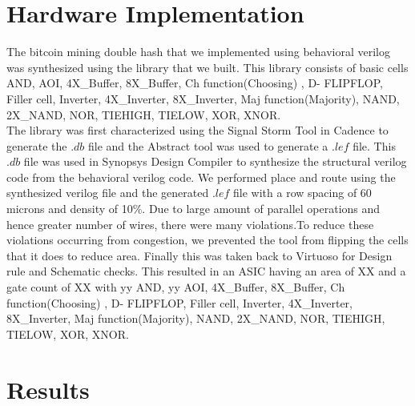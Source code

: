 \section{Hardware Implementation} 
The bitcoin mining double hash that we implemented using behavioral verilog was synthesized using the library that we built. This library consists of basic cells AND, AOI, 4X\_Buffer, 8X\_Buffer, Ch function(Choosing) , D- FLIPFLOP, Filler cell, Inverter, 4X\_Inverter, 8X\_Inverter, Maj function(Majority), NAND, 2X\_NAND, NOR, TIEHIGH, TIELOW, XOR, XNOR.
\\The library was first characterized using the Signal Storm Tool in Cadence to generate the $.db$ file and the Abstract tool was used to generate a $.lef$ file. This $.db$ file was used in Synopsys Design Compiler to synthesize the structural verilog code from the behavioral verilog code. We performed place and route using the synthesized verilog file and the generated $.lef$ file with a row spacing of 60 microns and density of 10\%. Due to large amount of parallel operations and hence greater number of wires, there were many violations.To reduce these violations occurring from congestion, we prevented the tool from flipping the cells that it does to reduce area. Finally this was taken back to Virtuoso for Design rule and Schematic checks. This resulted in an ASIC having an area of XX and a gate count of XX with yy AND, yy AOI, 4X\_Buffer, 8X\_Buffer, Ch function(Choosing) , D- FLIPFLOP, Filler cell, Inverter, 4X\_Inverter, 8X\_Inverter, Maj function(Majority), NAND, 2X\_NAND, NOR, TIEHIGH, TIELOW, XOR, XNOR.
\section{Results}
